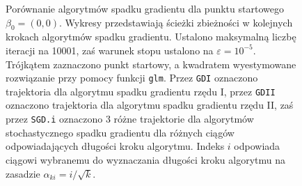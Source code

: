 \begin{figure}[hbt!]
  \caption[Porównanie algorytmów spadku gradientu dla punktu startowego $\beta_0 = (0,0)$.]{\label{fig:scasd}Porównanie algorytmów spadku gradientu dla punktu startowego $\beta_0 = (0,0)$. Wykresy przedstawiają ścieżki zbieżności w kolejnych krokach algorytmów spadku gradientu. Ustalono maksymalną liczbę iteracji na 10001, zaś warunek stopu ustalono na $\varepsilon=10^{-5}$. Trójkątem zaznaczono punkt startowy, a kwadratem wyestymowane rozwiązanie przy pomocy funkcji \texttt{glm}. Przez \texttt{GDI} oznaczono trajektoria dla algorytmu spadku gradientu rzędu I, przez \texttt{GDII} oznaczono trajektoria dla algorytmu spadku gradientu rzędu II, zaś przez \texttt{SGD.i} oznaczono 3 różne trajektorie dla algorytmów stochastycznego spadku gradientu dla różnych ciągów odpowiadających długości kroku algorytmu. Indeks $i$ odpowiada ciągowi wybranemu do wyznaczania długości kroku algorytmu na zasadzie $\alpha_{ki} = i/\sqrt{k}$.}
\end{figure}


